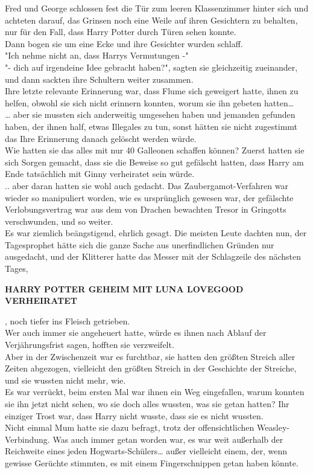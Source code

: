 {Fred und George schlossen fest die Tür zum leeren Klassenzimmer hinter sich und achteten darauf, das Grinsen noch eine Weile auf ihren Gesichtern zu behalten, nur für den Fall, dass Harry Potter durch Türen sehen konnte.\\ Dann bogen sie um eine Ecke und ihre Gesichter wurden schlaff.\\ "Ich nehme nicht an, dass Harrys Vermutungen -"\\ "- dich auf irgendeine Idee gebracht haben?", sagten sie gleichzeitig zueinander, und dann sackten ihre Schultern weiter zusammen.\\ Ihre letzte relevante Erinnerung war, dass Flume sich geweigert hatte, ihnen zu helfen, obwohl sie sich nicht erinnern konnten, worum sie ihn gebeten hatten…\\ … aber sie mussten sich anderweitig umgesehen haben und jemanden gefunden haben, der ihnen half, etwas Illegales zu tun, sonst hätten sie nicht zugestimmt das Ihre Erinnerung danach gelöscht werden würde.\\ Wie hatten sie das alles mit nur 40 Galleonen schaffen können? Zuerst hatten sie sich Sorgen gemacht, dass sie die Beweise so gut gefälscht hatten, dass Harry am Ende tatsächlich mit Ginny verheiratet sein würde.\\ .. aber daran hatten sie wohl auch gedacht. Das Zaubergamot-Verfahren war wieder so manipuliert worden, wie es ursprünglich gewesen war, der gefälschte Verlobungsvertrag war aus dem von Drachen bewachten Tresor in Gringotts verschwunden, und so weiter.\\ Es war ziemlich beängstigend, ehrlich gesagt. Die meisten Leute dachten nun, der Tagesprophet hätte sich die ganze Sache aus unerfindlichen Gründen nur ausgedacht, und der Klitterer hatte das Messer mit der Schlagzeile des nächsten Tages,

\textbf{HARRY POTTER GEHEIM MIT LUNA LOVEGOOD VERHEIRATET}

, noch tiefer ins Fleisch getrieben.\\ Wer auch immer sie angeheuert hatte, würde es ihnen nach Ablauf der Verjährungsfrist sagen, hofften sie verzweifelt.\\ Aber in der Zwischenzeit war es furchtbar, sie hatten den größten Streich aller Zeiten abgezogen, vielleicht den größten Streich in der Geschichte der Streiche, und sie wussten nicht mehr, wie.\\ Es war verrückt, beim ersten Mal war ihnen ein Weg eingefallen, warum konnten sie ihn jetzt nicht sehen, wo sie doch alles wussten, was sie getan hatten? Ihr einziger Trost war, dass Harry nicht wusste, dass sie es nicht wussten.\\ Nicht einmal Mum hatte sie dazu befragt, trotz der offensichtlichen Weasley-Verbindung. Was auch immer getan worden war, es war weit außerhalb der Reichweite eines jeden Hogwarts-Schülers… außer vielleicht einem, der, wenn gewisse Gerüchte stimmten, es mit einem Fingerschnippen getan haben könnte.

}
